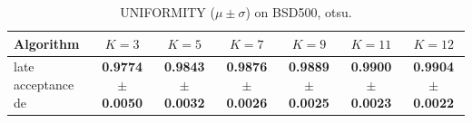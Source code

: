 \begin{table}[htbp]
\centering
\caption{UNIFORMITY ($\mu \pm \sigma$) on BSD500, otsu.}
\label{tab:exp1-otsu-uniformity}
\begin{tabular}{lcccccc}
\toprule
Algorithm & $K=3$ & $K=5$ & $K=7$ & $K=9$ & $K=11$ & $K=12$ \\
\midrule
late acceptance de & \textbf{0.9774 $\pm$ 0.0050} & \textbf{0.9843 $\pm$ 0.0032} & \textbf{0.9876 $\pm$ 0.0026} & \textbf{0.9889 $\pm$ 0.0025} & \textbf{0.9900 $\pm$ 0.0023} & \textbf{0.9904 $\pm$ 0.0022} \\
\bottomrule
\end{tabular}
\end{table}